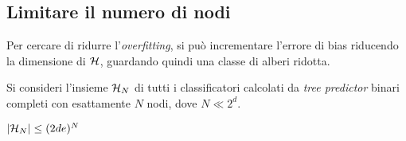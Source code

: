 \subsection{Limitare il numero di nodi}
Per cercare di ridurre l'\textit{overfitting}, si può incrementare l'errore di bias
riducendo la dimensione di $\mathcal{H}$, guardando quindi una classe di alberi ridotta.

Si consideri l'insieme $\mathcal{H}_N$ di tutti i classificatori calcolati da
\textit{tree predictor} binari completi con esattamente $N$ nodi, dove $N\ll 2^d$.

\begin{observation}
    $|\mathcal{H}_N| \leq (2de)^N$
\end{observation}